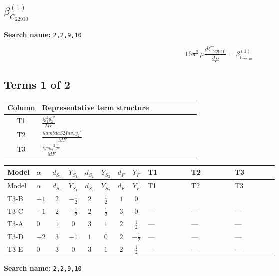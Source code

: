 \documentclass[8pt]{article}
\begin{document}
\begin{landscape}
\section*{$\beta_{C_{22910}}^{(1)}$}
\noindent\textbf{Search name: }\texttt{2,2,9,10}\par\smallskip
\[16\pi^2\,\mu\frac{d C_{22910}}{d\mu}=\beta_{C_{22910}}^{(1)}\]
\subsection*{Terms 1 of 2}
\begin{center}
\begin{tabular}{@{}c >{\raggedright\arraybackslash}p{0.82\linewidth}@{}}
\toprule
Column & Representative term structure \\
\midrule
T1 & \(\displaystyle \frac{i g_{2}^{2} \overline{y_{2}}^{2}}{MF}\) \\
\midrule
T2 & \(\displaystyle \frac{i lambdaS2Inv1 \overline{y_{2}}^{2}}{MF}\) \\
\midrule
T3 & \(\displaystyle \frac{i ye \overline{y_{2}}^{2} \overline{ye}}{MF}\) \\
\midrule
\bottomrule
\end{tabular}
\end{center}
\smallskip
\tiny
\begin{longtable}{@{}llcccccc >{\raggedright\arraybackslash}p{0.21\linewidth} >{\raggedright\arraybackslash}p{0.21\linewidth} >{\raggedright\arraybackslash}p{0.21\linewidth}@{}}
\toprule
Model & $\alpha$ & $d_{S_1}$ & $Y_{S_1}$ & $d_{S_2}$ & $Y_{S_2}$ & $d_F$ & $Y_F$ & T1 & T2 & T3 \\
\midrule
\endfirsthead
\toprule
Model & $\alpha$ & $d_{S_1}$ & $Y_{S_1}$ & $d_{S_2}$ & $Y_{S_2}$ & $d_F$ & $Y_F$ & T1 & T2 & T3 \\
\midrule
\endhead
T3-B & $-1$ & $2$ & $-\frac{1}{2}$ & $2$ & $\frac{1}{2}$ & $1$ & $0$ & \scriptsize\adjustbox{max width=\linewidth}{$\begin{gathered} - \frac{3 i g_{2}^{2} \overline{y_{2}}^{2}}{4 MF}\end{gathered}$} & \scriptsize\adjustbox{max width=\linewidth}{$\begin{gathered} - \frac{i lambdaS2Inv1 \overline{y_{2}}^{2}}{2 MF}\end{gathered}$} & \scriptsize\adjustbox{max width=\linewidth}{$\begin{gathered} \frac{i ye \overline{y_{2}}^{2} \overline{ye}}{4 MF}\end{gathered}$} \\
\midrule
T3-C & $-1$ & $2$ & $-\frac{1}{2}$ & $2$ & $\frac{1}{2}$ & $3$ & $0$ & --- & --- & --- \\
\midrule
T3-A & $0$ & $1$ & $0$ & $3$ & $1$ & $2$ & $\frac{1}{2}$ & --- & --- & --- \\
\midrule
T3-D & $-2$ & $3$ & $-1$ & $1$ & $0$ & $2$ & $-\frac{1}{2}$ & --- & --- & --- \\
\midrule
T3-E & $0$ & $3$ & $0$ & $3$ & $1$ & $2$ & $\frac{1}{2}$ & --- & --- & --- \\
\midrule
\bottomrule
\end{longtable}
\clearpage
\noindent\textbf{Search name: }\texttt{2,2,9,10}\par\smallskip

\end{landscape}
\end{document}
